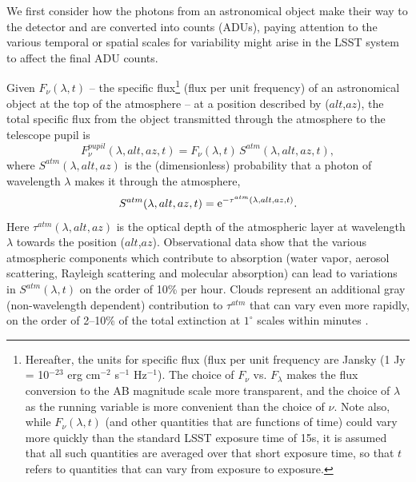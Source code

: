 \documentclass[12pt,preprint]{aastex}
\begin{document}
We first consider how the photons from an astronomical object make their
way to the detector and are converted into counts (ADUs), paying attention to the various
temporal or spatial scales for variability might arise in the LSST
system to affect the final ADU counts. 

Given $F_\nu(\lambda, t)$ --
the specific flux\footnote{Hereafter, the units for specific
flux (flux per unit frequency  are Jansky (1 Jy = 10$^{-23}$ erg cm$^{-2}$ s$^{-1}$
Hz$^{-1}$). The choice of $F_\nu$ vs. $F_\lambda$ makes the flux
conversion to the AB magnitude scale more transparent, and the choice
of $\lambda$ as the running variable is more convenient than the
choice of $\nu$. Note also, while $F_\nu(\lambda,t)$ (and other
quantities that are functions of time) could vary more quickly than
the standard LSST exposure time of 15s, it is assumed that all such
quantities are averaged over that short exposure time, so that $t$
refers to quantities that can vary from exposure to exposure. }
(flux per unit frequency) of an astronomical object at
the top of the atmosphere -- at a position described by ($alt$,$az$),
the total specific flux from the object transmitted through the atmosphere to the telescope pupil is
\begin{equation}
\label{eqn:Fpupil}
   F_\nu^{pupil}(\lambda,alt,az,t) = F_\nu(\lambda, t) \, S^{atm}(\lambda,alt,az,t),
\end{equation}
where $S^{atm}(\lambda,alt,az)$ is the (dimensionless) probability that a photon of 
wavelength $\lambda$ makes it through the atmosphere,
\begin{equation}
\label{eqn:atmTau}
   S^{atm}(\lambda,alt,az,t)   = {\rm e}^{-\tau^{atm}(\lambda,alt,az,t)}.
\end{equation}
Here $\tau^{atm}(\lambda,alt,az)$ is the optical depth of the
atmospheric layer at wavelength $\lambda$ towards the position
($alt$,$az$). Observational data \citep{Stubbs2007b, Burke2010b} show
that the various atmospheric components which contribute to absorption
(water vapor, aerosol scattering, Rayleigh scattering and molecular
absorption) can lead to variations in $S^{atm}(\lambda,t)$ on the
order of 10\% per hour. Clouds represent an additional gray (non-wavelength
dependent) contribution to $\tau^{atm}$ that can vary even more
rapidly, on the order of 2--10\% of the total extinction at $1^{\circ}$
scales within minutes \citep{Ivezic2007}.
\end{document}
